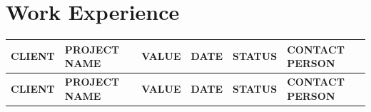 \documentclass[a4paper,11pt]{article}
\begin{document}
\newpage

\section{Work Experience}

{\color{awenDarkGrey}\scriptsize
\renewcommand{\arraystretch}{1.35}
\begin{longtable}{@{} p{2.8cm} p{4.6cm} p{1.6cm} C{1.0cm} p{1.6cm} p{3.4cm} @{}}
  \toprule
  \textcolor{awenWhite}{\bfseries CLIENT} & 
  \textcolor{awenWhite}{\bfseries PROJECT NAME} & 
  \textcolor{awenWhite}{\bfseries VALUE} & 
  \textcolor{awenWhite}{\bfseries DATE} &
  \textcolor{awenWhite}{\bfseries STATUS} &
  \textcolor{awenWhite}{\bfseries CONTACT PERSON} \\
  \midrule
  \endfirsthead

  \toprule
  \textcolor{awenWhite}{\bfseries CLIENT} & 
  \textcolor{awenWhite}{\bfseries PROJECT NAME} & 
  \textcolor{awenWhite}{\bfseries VALUE} & 
  \textcolor{awenWhite}{\bfseries DATE} &
  \textcolor{awenWhite}{\bfseries STATUS} &
  \textcolor{awenWhite}{\bfseries CONTACT PERSON} \\
  \midrule
  \endhead
  

\end{longtable}}
\end{document}
